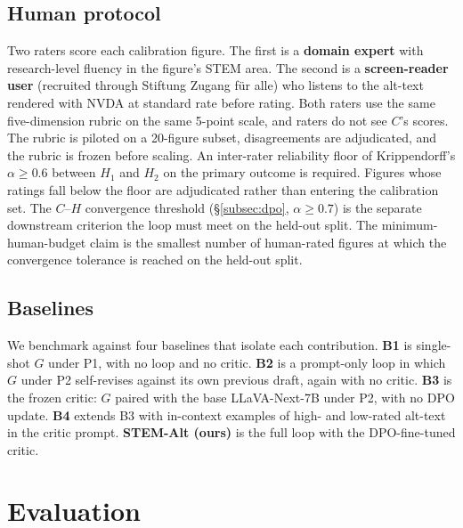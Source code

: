\documentclass[pdflatex,sn-mathphys-num]{sn-jnl}
\begin{document}
\subsection{Human protocol}\label{subsec:human}

Two raters score each calibration figure. The first is a \textbf{domain expert} with research-level fluency in the figure's STEM area. The second is a \textbf{screen-reader user} (recruited through Stiftung Zugang f\"ur alle) who listens to the alt-text rendered with NVDA at standard rate before rating. Both raters use the same five-dimension rubric on the same 5-point scale, and raters do not see $C$'s scores. The rubric is piloted on a 20-figure subset, disagreements are adjudicated, and the rubric is frozen before scaling. An inter-rater reliability floor of Krippendorff's $\alpha \geq 0.6$ between $H_1$ and $H_2$ on the primary outcome is required. Figures whose ratings fall below the floor are adjudicated rather than entering the calibration set. The $C$--$H$ convergence threshold (\S\ref{subsec:dpo}, $\alpha \geq 0.7$) is the separate downstream criterion the loop must meet on the held-out split. The minimum-human-budget claim is the smallest number of human-rated figures at which the convergence tolerance is reached on the held-out split.

\subsection{Baselines}\label{subsec:baselines}

We benchmark against four baselines that isolate each contribution. \textbf{B1} is single-shot $G$ under P1, with no loop and no critic. \textbf{B2} is a prompt-only loop in which $G$ under P2 self-revises against its own previous draft, again with no critic. \textbf{B3} is the frozen critic: $G$ paired with the base LLaVA-Next-7B under P2, with no DPO update. \textbf{B4} extends B3 with in-context examples of high- and low-rated alt-text in the critic prompt. \textbf{STEM-Alt (ours)} is the full loop with the DPO-fine-tuned critic.

\section{Evaluation}\label{sec:eval}
\end{document}
